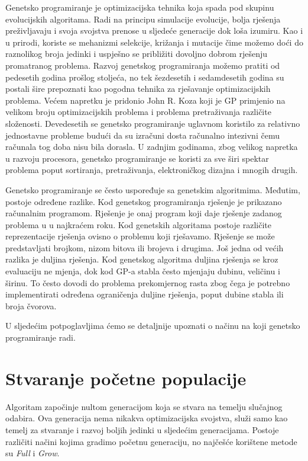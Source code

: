 \documentclass[times, utf8, zavrsni]{fer}
\begin{document}
Genetsko programiranje je optimizacijska tehnika koja spada pod skupinu evolucijskih algoritama. Radi na principu simulacije evolucije, bolja rješenja preživljavaju i svoja svojstva prenose u sljedeće generacije dok loša izumiru. Kao i u prirodi, koriste se mehanizmi selekcije, križanja i mutacije čime možemo doći do raznolikog broja jedinki i uspješno se približiti dovoljno dobrom rješenju promatranog problema. Razvoj genetskog programiranja možemo pratiti od pedesetih godina prošlog stoljeća, no tek šezdesetih i sedamdesetih godina su postali šire prepoznati kao pogodna tehnika za rješavanje optimizacijskih problema. Većem napretku je pridonio John R. Koza koji je GP primjenio na velikom broju optimizacijskih problema i problema pretraživanja različite složenosti. Devedesetih se genetsko programiranje uglavnom koristilo za relativno jednostavne probleme budući da su izračuni dosta računalno intezivni čemu računala tog doba nisu bila dorasla. U zadnjim godinama, zbog velikog napretka u razvoju procesora, genetsko programiranje se koristi za sve širi spektar problema poput sortiranja, pretraživanja, elektroničkog dizajna i mnogih drugih. 

Genetsko programiranje se često uspoređuje sa genetskim algoritmima. Međutim, postoje određene razlike. Kod genetskog programiranja rješenje je prikazano računalnim programom. Rješenje je onaj program koji daje rješenje zadanog problema u u najkraćem roku. Kod genetskih algoritama postoje različite reprezentacije rješenja ovisno o problemu koji rješavamo. Rješenje se može predstavljati brojkom, nizom bitova ili brojeva i drugima. Još jedna od većih razlika je duljina rješenja. Kod genetskog algoritma duljina rješenja se kroz evaluaciju ne mjenja, dok kod GP-a stabla često mjenjaju dubinu, veličinu i širinu. To često dovodi do problema prekomjernog rasta zbog čega je potrebno implementirati određena ograničenja duljine rješenja, poput dubine stabla ili broja čvorova.

U sljedećim potpoglavljima ćemo se detaljnije upoznati o načinu na koji genetsko programiranje radi.

\section{Stvaranje početne populacije}
Algoritam započinje nultom generacijom koja se stvara na temelju slučajnog odabira. Ova generacija nema nikakva optimizacijska svojstva, služi samo kao temelj za stvaranje i razvoj boljih jedinki u sljedećim generacijama. Postoje različiti načini kojima gradimo početnu generaciju, no najčešće korištene metode su \textit{Full} i \textit{Grow}.
\end{document}
